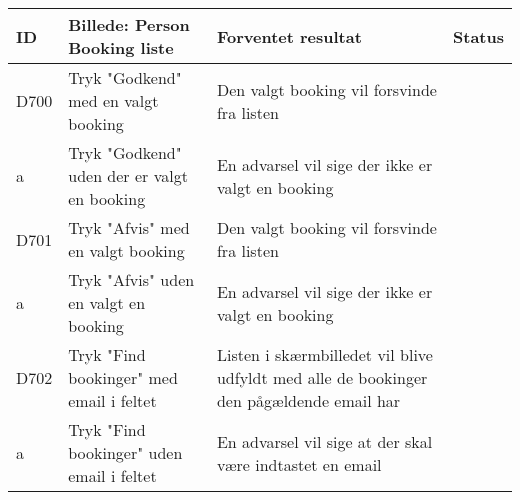 \begin{tabularx}{\textwidth}{ |X|X|X|X| }
\hline
	ID & Billede: Person Booking liste   & Forventet resultat & Status\\ 
\hline
	D700 & Tryk "Godkend" med en valgt booking & Den valgt booking vil forsvinde fra listen & \\
\hline
	a & Tryk "Godkend" uden der er valgt en booking & En advarsel vil sige der ikke er valgt en booking & \\
\hline
	D701 & Tryk "Afvis" med en valgt booking & Den valgt booking vil forsvinde fra listen & \\
\hline
	a & Tryk "Afvis" uden en valgt en booking & En advarsel vil sige der ikke er valgt en booking & \\
\hline
	D702 & Tryk "Find bookinger" med email i feltet & Listen i skærmbilledet vil blive udfyldt med alle de bookinger den pågældende email har & \\
\hline 
	a & Tryk "Find bookinger" uden email i feltet & En advarsel vil sige at der skal være indtastet en email & \\
\hline
\end{tabularx}

